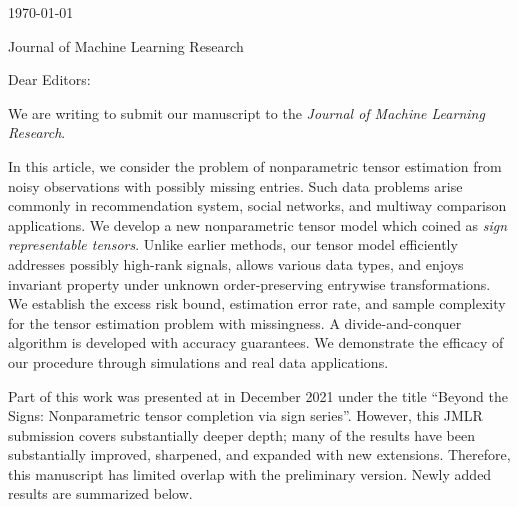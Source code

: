 \documentclass{article}
\begin{document}
\hfill{\today}

Journal of Machine Learning Research

\bigskip

Dear Editors:

We are writing to submit our manuscript  to the \emph{Journal of Machine Learning Research}.

In this article, we consider the problem of nonparametric tensor estimation from noisy observations with possibly missing entries. Such data problems arise commonly in recommendation system, social networks, and multiway comparison applications. We develop a new nonparametric tensor model which coined as \emph{sign representable tensors}. Unlike earlier methods, our tensor model efficiently addresses possibly high-rank signals, allows various data types, and enjoys invariant property under unknown order-preserving entrywise transformations. We establish the excess risk bound, estimation error rate, and sample complexity for the tensor estimation problem with missingness. A divide-and-conquer algorithm is developed with accuracy guarantees. We demonstrate the efficacy of our procedure through simulations and real data applications.

Part of this work was presented at  in December 2021 under the title ``Beyond the Signs: Nonparametric tensor completion via sign series''.  However, this JMLR submission covers substantially deeper depth; many of the results have been substantially improved, sharpened, and expanded with new extensions. Therefore, this manuscript has limited overlap with the preliminary version. Newly added results are summarized below.
\end{document}
